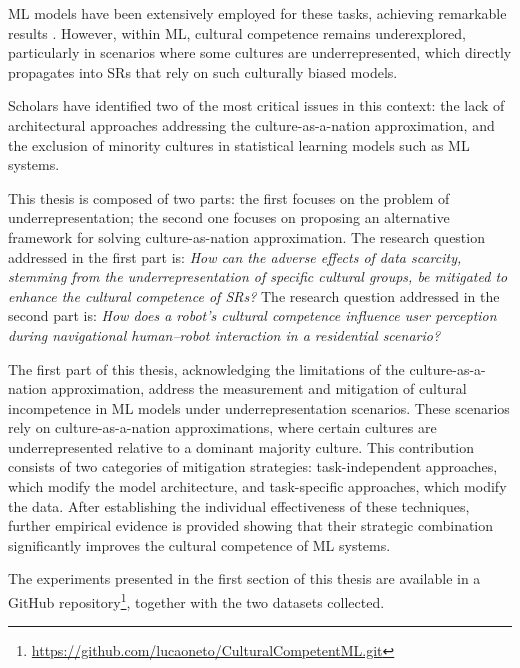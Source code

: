 ML models have been extensively employed for these tasks, achieving remarkable results \citep{DLRobotics, RLRobotics, MPRobotics, xu2020learning, bredeche2006perceptual, nguyen2020deep, zhou2022computer, arzani2020switching, hong2020multimodal, gao2021hybrid, yu2021deep}. 
However, within ML, cultural competence remains underexplored, particularly in scenarios where some cultures are underrepresented, which directly propagates into SRs that rely on such culturally biased models.

Scholars have identified two of the most critical issues in this context: the lack of architectural approaches addressing the culture-as-a-nation approximation, and the exclusion of minority cultures in statistical learning models such as ML systems.

This thesis is composed of two parts: the first focuses on the problem of underrepresentation; the second one focuses on proposing an alternative framework for solving culture-as-nation approximation. 
The research question addressed in the first part is:
\textit{How can the adverse effects of data scarcity, stemming from the underrepresentation of specific cultural groups, be mitigated to enhance the cultural competence of SRs?}
The research question addressed in the second part is:
\textit{How does a robot’s cultural competence influence user perception during navigational human--robot interaction in a residential scenario?}

The first part of this thesis, acknowledging the limitations of the culture-as-a-nation approximation, address the measurement and mitigation of cultural incompetence in ML models under underrepresentation scenarios. 
These scenarios rely on culture-as-a-nation approximations, where certain cultures are underrepresented relative to a dominant majority culture. 
This contribution consists of two categories of mitigation strategies: task-independent approaches, which modify the model architecture, and task-specific approaches, which modify the data.
After establishing the individual effectiveness of these techniques, further empirical evidence is provided showing that their strategic combination significantly improves the cultural competence of ML systems.

The experiments presented in the first section of this thesis are available in a GitHub repository\footnote{\url{https://github.com/lucaoneto/CulturalCompetentML.git}\label{ch1:url:repodata}}, together with the two datasets collected.


